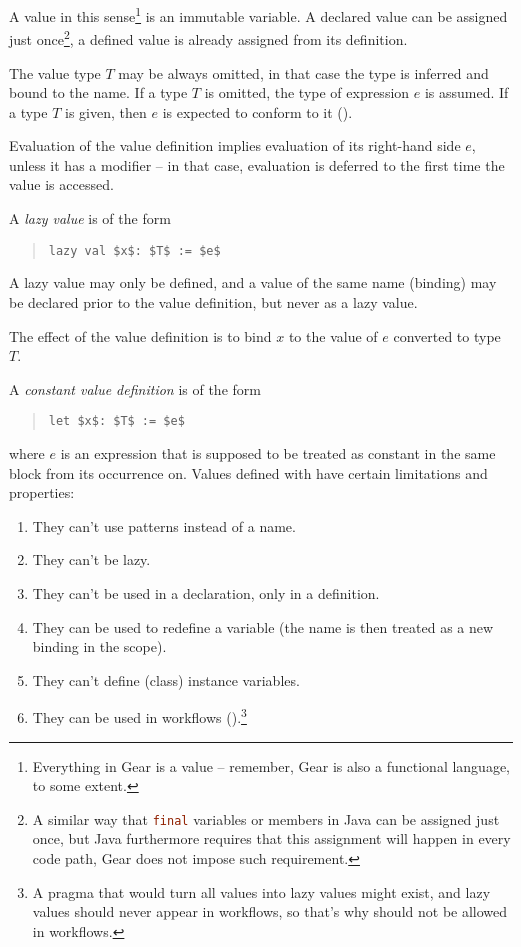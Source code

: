 A value in this sense\footnote{Everything in Gear is a value -- remember, Gear is also a functional language, to some extent.} is an immutable variable. A declared value can be assigned just once\footnote{A similar way that \lstinline[language=Java]@final@ variables or members in Java can be assigned just once, but Java furthermore requires that this assignment will happen in every code path, Gear does not impose such requirement.}, a defined value is already assigned from its definition. 

The value type $T$ may be always omitted, in that case the type is inferred and bound to the name. If a type $T$ is omitted, the type of expression $e$ is assumed. If a type $T$ is given, then $e$ is expected to conform to it (). 

Evaluation of the value definition implies evaluation of its right-hand side $e$, unless it has a modifier  -- in that case, evaluation is deferred to the first time the value is accessed. 

A {\em lazy value} is of the form
\begin{quote}\begin{lstlisting}
lazy val $x$: $T$ := $e$
\end{lstlisting}\end{quote}

A lazy value may only be defined, and a value of the same name (binding) may be declared prior to the value definition, but never as a lazy value. 

The effect of the value definition is to bind $x$ to the value of $e$ converted to type $T$. 

A {\em constant value definition} is of the form 
\begin{quote}\begin{lstlisting}
let $x$: $T$ := $e$
\end{lstlisting}\end{quote}
where $e$ is an expression that is supposed to be treated as constant in the same block from its occurrence on. Values defined with  have certain limitations and properties:

\begin{enumerate}
\item They can't use patterns instead of a name. 
\item They can't be lazy. 
\item They can't be used in a declaration, only in a definition. 
\item They can be used to redefine a variable (the name is then treated as a new binding in the scope). 
\item They can't define (class) instance variables. 
\item They can be used in workflows ().\footnote{A pragma that would turn all values into lazy values might exist, and lazy values should never appear in workflows, so that's why  should not be allowed in workflows.}
\end{enumerate}

